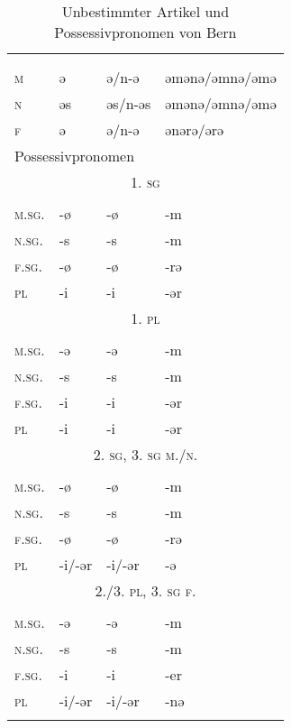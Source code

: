 \begin{table}[H]
	\caption{Unbestimmter Artikel und Possessivpronomen von Bern \citep[79, 98-101]{Marti1985}}\label{table111}
	\begin{tabular}{llll}
		\lsptoprule
		\multicolumn{4}{l}{unbestimmter Artikel}\\	
		& \NOM & \AKK & \DAT\\\midrule
		\textsc{m} & ə & ə/n-ə & əmənə/əmnə/əmə\\
		\textsc{n} & əs & əs/n-əs & əmənə/əmnə/əmə\\
		\textsc{f} & ə & ə/n-ə & ənərə/ərə\\ \midrule
		\multicolumn{4}{l}{Possessivpronomen}\\
		\multicolumn{4}{c}{\scshape1. \textsc{sg}} \\\cmidrule(lr){1-4}
		& \NOM & \AKK & \DAT\\\midrule
		\textsc{m.sg.} & {}-ø & {}-ø & {}-m\\
		\textsc{n.sg.} & {}-s & {}-s & {}-m\\
		\textsc{f.sg.} & {}-ø & {}-ø & {}-rə\\
		\textsc{pl} & {}-i & {}-i & {}-ər\\ \midrule
		\multicolumn{4}{c}{\scshape 1. \textsc{pl}} \\\cmidrule(lr){1-4}
		& \NOM & \AKK & \DAT\\\midrule
		\textsc{m.sg.} & {}-ə & {}-ə & {}-m\\
		\textsc{n.sg.} & {}-s & {}-s & {}-m\\
		\textsc{f.sg.} & {}-i & {}-i & {}-ər\\
		\textsc{pl} & {}-i & {}-i & {}-ər\\ \midrule
		\multicolumn{4}{c}{\scshape 2. \textsc{sg}, 3. \textsc{sg} m./n.} \\\cmidrule(lr){1-4}
		& \NOM & \AKK & \DAT\\\midrule
		\textsc{m.sg.} & {}-ø & {}-ø & {}-m\\
		\textsc{n.sg.} & {}-s & {}-s & {}-m\\
		\textsc{f.sg.} & {}-ø & {}-ø & {}-rə\\
		\textsc{pl} & {}-i/-ər & {}-i/-ər & {}-ə\\ \midrule
		\multicolumn{4}{c}{\scshape 2./3. \textsc{pl}, 3. \textsc{sg} f.} \\
		& \NOM & \AKK & \DAT\\\midrule
		\textsc{m.sg.} & {}-ə & {}-ə & {}-m\\
		\textsc{n.sg.} & {}-s & {}-s & {}-m\\
		\textsc{f.sg.} & {}-i & {}-i & {}-er\\
		\textsc{pl} & {}-i/-ər & {}-i/-ər & {}-nə\\
		\lspbottomrule
	\end{tabular}
\end{table}

